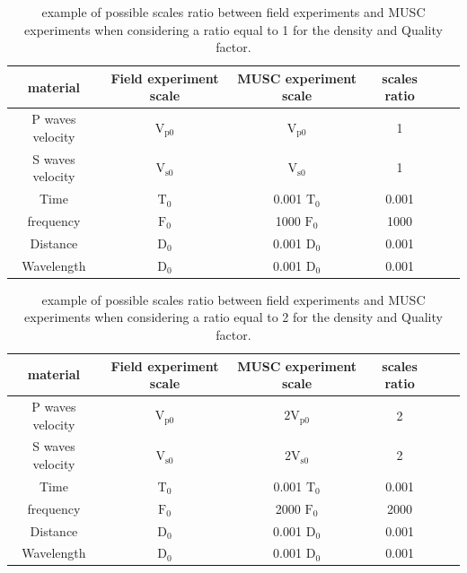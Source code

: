 \documentclass[manuscript,revised]{geophysics}
\begin{document}
\begin{table}[!ht]
	\centering
	\begin{tabular}{cccccc}
		\hline
		material & Field experiment scale & MUSC experiment scale & scales ratio  \\
		\hline
		P waves velocity & $\mathrm{V_{p 0}}$ & $\mathrm{V_{p 0}}$  & 1  \\
		S waves velocity & $\mathrm{V_{s 0}}$ &  $\mathrm{V_{s 0}}$ & 1   \\
		Time & $\mathrm{T_{0}}$    & 0.001 $\mathrm{T_{0}}$ & 0.001  \\
		frequency   & $\mathrm{F_{0}}$  & 1000 $\mathrm{F_{0}}$ & 1000  \\
		Distance   & $\mathrm{D_{0}}$  & 0.001 $\mathrm{D_{0}}$ & 0.001   \\
		Wavelength   & $\mathrm{D_{0}}$ & 0.001 $\mathrm{D_{0}}$ & 0.001  \\
		\hline
	\end{tabular}
	\caption{ example of possible scales ratio between field experiments and MUSC experiments when considering a ratio equal to 1 for the density and Quality factor.}
	\label{epoxy-resin}
\end{table}

\begin{table}[!ht]
	\centering
	\begin{tabular}{cccccc}
		\hline
		material & Field experiment scale & MUSC experiment scale & scales ratio  \\
		\hline
		P waves velocity & $\mathrm{V_{p 0}}$ & $\mathrm{2V_{p 0}}$  & 2  \\
		S waves velocity & $\mathrm{V_{s 0}}$ &  $\mathrm{2V_{s 0}}$ & 2   \\
		Time & $\mathrm{T_{0}}$    & 0.001 $\mathrm{T_{0}}$ & 0.001  \\
		frequency   & $\mathrm{F_{0}}$  & 2000 $\mathrm{F_{0}}$ & 2000  \\
		Distance   & $\mathrm{D_{0}}$  & 0.001 $\mathrm{D_{0}}$ & 0.001   \\
		Wavelength   & $\mathrm{D_{0}}$ & 0.001 $\mathrm{D_{0}}$ & 0.001  \\
		\hline
	\end{tabular}
	\caption{ example of possible scales ratio between field experiments and MUSC experiments when considering a ratio equal to 2 for the density and Quality factor.}
	\label{epoxy-resin}
\end{table}
\end{document}
